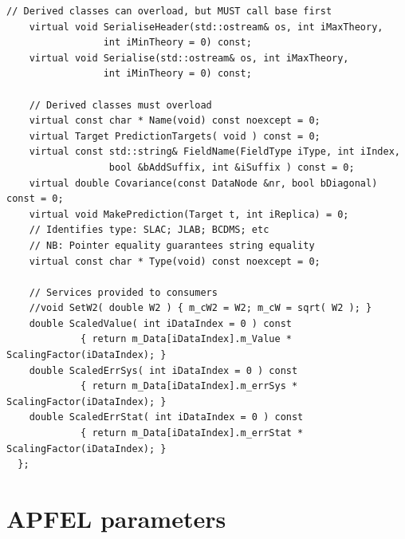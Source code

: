 \documentclass[12pt,a4paper]{report}
\begin{document}
\begin{Verbatim}[fontsize=\small]
    // Derived classes can overload, but MUST call base first
    virtual void SerialiseHeader(std::ostream& os, int iMaxTheory,
				 int iMinTheory = 0) const;
    virtual void Serialise(std::ostream& os, int iMaxTheory,
				 int iMinTheory = 0) const;

    // Derived classes must overload
    virtual const char * Name(void) const noexcept = 0;
    virtual Target PredictionTargets( void ) const = 0;
    virtual const std::string& FieldName(FieldType iType, int iIndex,
				  bool &bAddSuffix, int &iSuffix ) const = 0;
    virtual double Covariance(const DataNode &nr, bool bDiagonal) const = 0;
    virtual void MakePrediction(Target t, int iReplica) = 0;
    // Identifies type: SLAC; JLAB; BCDMS; etc
    // NB: Pointer equality guarantees string equality
    virtual const char * Type(void) const noexcept = 0;

    // Services provided to consumers
    //void SetW2( double W2 ) { m_cW2 = W2; m_cW = sqrt( W2 ); }
    double ScaledValue( int iDataIndex = 0 ) const
             { return m_Data[iDataIndex].m_Value * ScalingFactor(iDataIndex); }
    double ScaledErrSys( int iDataIndex = 0 ) const
             { return m_Data[iDataIndex].m_errSys * ScalingFactor(iDataIndex); }
    double ScaledErrStat( int iDataIndex = 0 ) const
             { return m_Data[iDataIndex].m_errStat * ScalingFactor(iDataIndex); }
  };
\end{Verbatim}

\section{APFEL parameters} \label{APFEL:Params}
\end{document}

